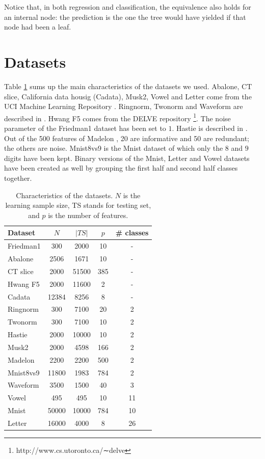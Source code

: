 \documentclass{article}
\begin{document}
Notice that, in both regression and classification, the equivalence also holds 
for an internal node: the prediction is the one the tree would have yielded if 
that node had been a leaf.


\section{Datasets}

Table \ref{tab:datasets} sums up the main characteristics of the datasets we 
used. Abalone, CT slice, California data housig (Cadata), Musk2, Vowel and 
Letter come from the UCI Machine Learning Repository \cite{uci}. Ringnorm, 
Twonorm and Waveform are described in \cite{breiman1998arcing}. Hwang F5 comes 
from the DELVE repository \footnote{http://www.cs.utoronto.ca/∼delve}.
The noise parameter of the Friedman1 dataset \cite{friedman11991} has 
been set to $1$. Hastie is described in \cite{hastie2009}. Out of the 500 
features of Madelon \cite{guyon2004madelon}, 20 are informative and 50 are 
redundant; the others are noise.
Mnist8vs9 is the Mnist dataset \cite{lecun1998mnist} of which only the $8$ and 
$9$ digits have been kept. Binary versions of the Mnist, Letter and Vowel 
datasets have been created as well by grouping the first half and second half 
classes together.

\begin{table}[th]
\caption{Characteristics of the datasets. $N$ is the learning sample size, TS 
stands for testing set, and $p$ is the number of features.}
\label{tab:datasets}
\begin{center}
\begin{footnotesize}
\begin{sc}
\begin{tabular}{l|cccc}
\hline
Dataset & $N$ & $|TS|$ & $p$ & \# classes\\
\hline
Friedman1 & 300 & 2000 & 10 & - \\
Abalone & 2506 & 1671 & 10 & - \\
CT slice & 2000 & 51500 & 385 & - \\
Hwang F5 & 2000 & 11600 & 2 & - \\
Cadata & 12384 & 8256 & 8 & - \\
Ringnorm & 300 & 7100 & 20 & 2 \\
Twonorm & 300 & 7100 & 10 & 2 \\
Hastie & 2000 & 10000 & 10 & 2 \\
Musk2 & 2000 & 4598 & 166 & 2 \\
Madelon & 2200 & 2200 & 500 & 2 \\
Mnist8vs9 & 11800 & 1983 & 784 & 2 \\
Waveform & 3500 & 1500 & 40 & 3 \\
Vowel & 495 & 495 & 10 & 11 \\
Mnist & 50000 & 10000 & 784 & 10 \\
Letter & 16000 & 4000 & 8 & 26 \\
\hline
\end{tabular}
\end{sc}
\end{footnotesize}
\end{center}
\vskip -0.2in
\end{table}
\end{document}
